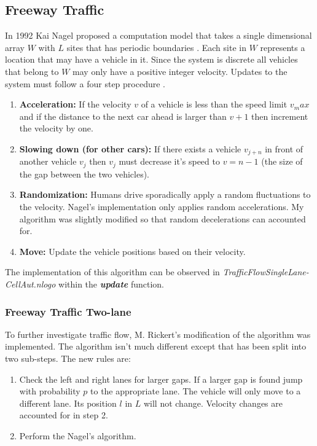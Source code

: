 \documentclass{article}%
\begin{document}
    \subsection{ Freeway Traffic }

    In 1992 Kai Nagel proposed a computation model that takes a single dimensional array $W$ with $L$ sites that has periodic boundaries \cite{nagel:freeway}. Each site in $W$ represents a location that may have a vehicle in it. Since the system is discrete all vehicles that belong to $W$ may only have a positive integer velocity. Updates to the system must follow a four step procedure \cite{nagel:freeway}.

    \begin{enumerate}
        \item {\bf Acceleration:} If the velocity $v$ of a vehicle is less than the speed limit $v_max$ and if the distance to the next car ahead is larger than $v + 1$ then increment the velocity by one. 
        \item {\bf Slowing down (for other cars):} If there exists a vehicle $v_{j+n}$ in front of another vehicle $v_j$ then $v_j$ must decrease it's speed to $v = n - 1$ (the size of the gap between the two vehicles). 
        \item {\bf Randomization:} Humans drive sporadically apply a random fluctuations to the velocity. Nagel's implementation only applies random accelerations. My algorithm was slightly modified so that random decelerations can accounted for. 
        \item {\bf Move:} Update the vehicle positions based on their velocity. 
    \end{enumerate}

    The implementation of this algorithm can be observed in {\it TrafficFlowSingleLane-CellAut.nlogo} within the {\it \bf update} function. 
    
    \subsubsection{ Freeway Traffic Two-lane}

    To further investigate traffic flow, M. Rickert's modification of the algorithm \cite{rickert:twolane} was implemented. The algorithm isn't much different except that has been split into two sub-steps. The new rules are:

    \begin{enumerate}
        \item Check the left and right lanes for larger gaps. If a larger gap is found jump with probability $p$ to the appropriate lane. The vehicle will only move to a different lane. Its position $l$ in $L$ will not change. Velocity changes are accounted for in step 2.  
        \item Perform the Nagel's algorithm.
    \end{enumerate} 
\end{document}
